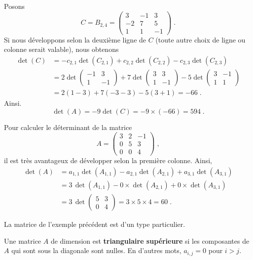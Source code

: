 {\begin{egg}
Posons
\[
C = B_{2,4} =
\begin{pmatrix} 3 & -1 & 3 \\ -2 & 7 & 5 \\ 1 & 1 & -1 \end{pmatrix} \; .
\]
Si nous développons selon la deuxième ligne de $C$ (toute autre choix de
ligne ou colonne serait valable), nous obtenons
\begin{align*}
\det(C) &= - c_{2,1} \det(C_{2,1}) + c_{2,2} \det(C_{2,2})
- c_{2,3} \det(C_{2,3}) \\
&= 2 \det\begin{pmatrix} -1 & 3 \\ 1 & -1 \end{pmatrix}
+ 7 \det\begin{pmatrix} 3 & 3 \\ 1 & -1 \end{pmatrix}
-5 \det\begin{pmatrix} 3 & -1\\ 1 & 1\end{pmatrix} \\
&= 2 ( 1 -3) + 7(-3-3) -5 (3+1) = -66 \; .
\end{align*}
Ainsi.
\[
\det(A) = -9 \det(C) = -9\times (-66) = 594 \; .
\]
\end{egg}

\begin{egg}
Pour calculer le déterminant de la matrice
\[
A= \begin{pmatrix} 3 & 2 & -1 \\ 0 & 5 & 3 \\
0 & 0 & 4 \end{pmatrix} \; ,
\]
il est très avantageux de développer selon la première colonne.  Ainsi,
\begin{align*}
\det(A) &= a_{1,1} \det(A_{1,1}) - a_{2,1} \det(A_{2,1})
+ a_{3,1}\det(A_{3,1}) \\
&= 3\, \det(A_{1,1}) - 0\times \det(A_{2,1}) + 0\times \det(A_{3,1}) \\
&= 3\, \det\begin{pmatrix} 5 & 3 \\ 0 & 4 \end{pmatrix}
= 3\times 5\times 4 = 60 \; .
\end{align*}
\end{egg}

La matrice de l'exemple précédent est d'un type particulier.

\begin{defn}
Une matrice $A$ de dimension \nn est
{\bfseries triangulaire supérieure} si les composantes de $A$ qui sont sous la diagonale
sont nulles.  En d'autres mots, $a_{i,j} =0$ pour $i>j$.


\end{defn}}
